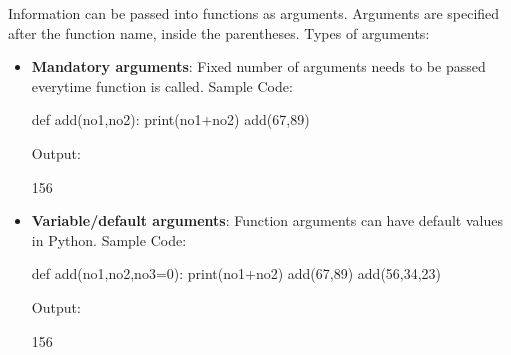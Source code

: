 \setlength{\columnsep}{3pt}
\begin{flushleft}
	
	Information can be passed into functions as arguments. \newline
	Arguments are specified after the function name, inside the parentheses.  \newline
	\newline
	Types of arguments:
	
	\begin{itemize}
		\item \textbf{Mandatory arguments}: Fixed number of arguments needs to be passed everytime function is called.
		\newline
		Sample Code:
		\begin{tcolorbox}[breakable,notitle,boxrule=-0pt,colback=black,colframe=black]
			\color{green}
			\font=9pt
			def add(no1,no2): \newline
			\hphantom{} \hphantom{} print(no1+no2) \newline
			\newline
			add(67,89)
			\font=4pt
		\end{tcolorbox}
		
		Output:
		\begin{tcolorbox}[breakable,notitle,boxrule=-0pt,colback=output,colframe=output]
			\color{black}
			156
			\font=4pt
		\end{tcolorbox}
		
		
		
		\item \textbf{Variable/default arguments}: Function arguments can have default values in Python.
		\newline
		Sample Code:
		\begin{tcolorbox}[breakable,notitle,boxrule=-0pt,colback=black,colframe=black]
			\color{green}
			\font=9pt
			def add(no1,no2,no3=0): \newline
			\hphantom{} \hphantom{} print(no1+no2) \newline
			\newline
			add(67,89) \newline
			add(56,34,23) 
			\font=4pt
		\end{tcolorbox}
		
		Output:
		\begin{tcolorbox}[breakable,notitle,boxrule=-0pt,colback=output,colframe=output]
			\color{black}
			156 
			\font=4pt
		\end{tcolorbox}
		

\end{itemize}
\end{flushleft}
